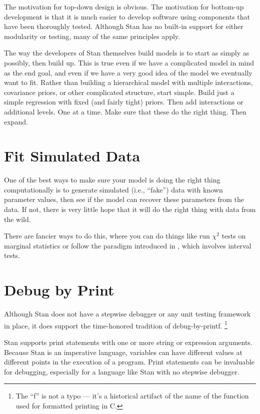 The motivation for top-down design is obvious.  The motivation for
bottom-up development is that it is much easier to develop software
using components that have been thoroughly tested.  Although Stan has
no built-in support for either modularity or testing, many of the same
principles apply.  

The way the developers of Stan themselves build models is to start as
simply as possibly, then build up. This is true even if we have a
complicated model in mind as the end goal, and even if we have a very
good idea of the model we eventually want to fit.  Rather than
building a hierarchical model with multiple interactions, covariance
priors, or other complicated structure, start simple.  Build just a
simple regression with fixed (and fairly tight) priors.  Then add
interactions or additional levels.  One at a time.  Make sure that
these do the right thing.  Then expand.

\section{Fit Simulated Data}

One of the best ways to make sure your model is doing the right thing
computationally is to generate simulated (i.e., ``fake'') data with
known parameter values, then see if the model can recover these
parameters from the data.  If not, there is very little hope that it
will do the right thing with data from the wild.  

There are fancier ways to do this, where you can do things like run
$\chi^2$ tests on marginal statistics or follow the paradigm
introduced in \citep{CookGelmanRubin:2006}, which involves interval
tests.  

\section{Debug by Print}

Although Stan does not have a stepwise debugger or any unit testing
framework in place, it does support the time-honored tradition of
debug-by-printf.
%
\footnote{The ``f'' is not a typo --- it's a historical artifact of
  the name of the  function used for formatted printing
  in C.} 

Stan supports print statements with one or more string or expression
arguments.  Because Stan is an imperative language, variables can have
different values at different points in the execution of a program.
Print statements can be invaluable for debugging, especially for a
language like Stan with no stepwise debugger.

